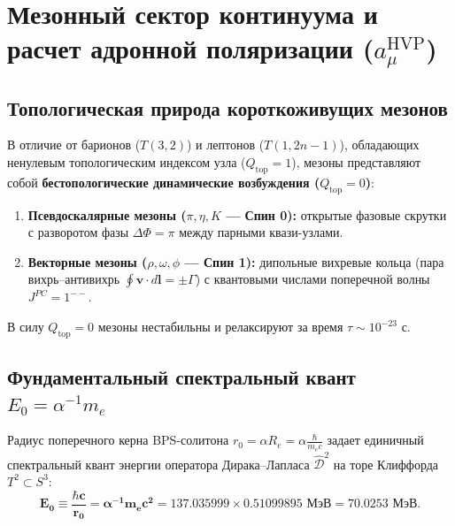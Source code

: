 \documentclass[12pt,a4paper]{article}
\begin{document}
	\section{Мезонный сектор континуума и расчет адронной поляризации ($a_\mu^{\text{HVP}}$)}
	
	\subsection{Топологическая природа короткоживущих мезонов}
	В отличие от барионов ($T(3,2)$) и лептонов ($T(1, 2n-1)$), обладающих ненулевым топологическим индексом узла ($Q_{\text{top}} = 1$), мезоны представляют собой \textbf{бестопологические динамические возбуждения ($Q_{\text{top}} = 0$)}:
	\begin{enumerate}
		\item \textbf{Псевдоскалярные мезоны ($\pi, \eta, K$ --- Спин 0):} открытые фазовые скрутки с разворотом фазы $\Delta \Phi = \pi$ между парными квази-узлами.
		\item \textbf{Векторные мезоны ($\rho, \omega, \phi$ --- Спин 1):} дипольные вихревые кольца (пара вихрь--антивихрь $\oint \mathbf{v} \cdot d\mathbf{l} = \pm \Gamma$) с квантовыми числами поперечной волны $J^{PC} = 1^{--}$.
	\end{enumerate}
	В силу $Q_{\text{top}} = 0$ мезоны нестабильны и релаксируют за время $\tau \sim 10^{-23}$ с.
	
	\subsection{Фундаментальный спектральный квант $E_0 = \alpha^{-1} m_e$}
	Радиус поперечного керна BPS-солитона $r_0 = \alpha R_e = \alpha \frac{\hbar}{m_e c}$ задает единичный спектральный квант энергии оператора Дирака--Лапласа $\hat{\mathcal{D}}^2$ на торе Клиффорда $T^2 \subset S^3$:
	\begin{equation}
		\mathbf{E_0 \equiv \frac{\hbar c}{r_0} = \alpha^{-1} m_e c^2 = 137.035999 \times 0.51099895 \text{ МэВ} = \mathbf{70.0253 \text{ МэВ}}}.
	\end{equation}
	
\end{document}
